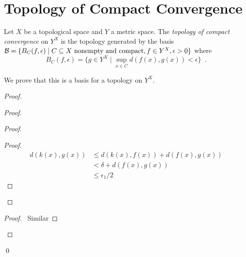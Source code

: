 \section{Topology of Compact Convergence}

\begin{definition}
    Let $X$ be a topological space and $Y$ a metric space. The \emph{topology of compact convergence} on $Y^X$ is the topology
    generated by the basis $\mathcal{B} = \{ B_C(f, \epsilon) \mid C \subseteq X \text{ nonempty and compact}, f \in Y^X, \epsilon > 0 \}$
    where
    \[ B_C(f, \epsilon) = \{ g \in Y^X \mid \sup_{x \in C} d(f(x), g(x)) < \epsilon \} \enspace . \]

    We prove that this is a basis for a topology on $Y^X$.
\end{definition}

\begin{proof}
    \pf
    \begin{proof}
        \begin{proof}
            \begin{proof}
                \pf
                \begin{align*}
                    d(k(x),g(x)) & \leq d(k(x),f(x)) + d(f(x),g(x)) \\
                    & < \delta + d(f(x),g(x)) \\
                    & \leq \epsilon_1/2
                \end{align*}
            \end{proof}
        \end{proof}
        \begin{proof}
            \pf\ Similar
        \end{proof}
    \end{proof}
    \qed
\end{proof}


